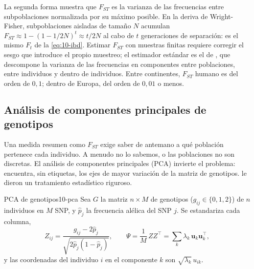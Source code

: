 La segunda forma muestra que $F_{ST}$ es la varianza de las frecuencias entre subpoblaciones normalizada por su máximo posible. En la deriva de Wright-Fisher, subpoblaciones aisladas de tamaño $N$ acumulan $F_{ST}\approx 1-(1-1/2N)^t\approx t/2N$ al cabo de $t$ generaciones de separación: es el mismo $F_t$ de la \cref{eq:10-ibd}. Estimar $F_{ST}$ con muestras finitas requiere corregir el sesgo que introduce el propio muestreo; el estimador estándar es el de \textcite{c10-weir1984}, que descompone la varianza de las frecuencias en componentes entre poblaciones, entre individuos y dentro de individuos. Entre continentes, $F_{ST}$ humano es del orden de $0{,}1$; dentro de Europa, del orden de $0{,}01$ o menos.

\subsection{Análisis de componentes principales de genotipos}

Una medida resumen como $F_{ST}$ exige saber de antemano a qué población pertenece cada individuo. A menudo no lo sabemos, o las poblaciones no son discretas. El análisis de componentes principales (PCA) invierte el problema: encuentra, sin etiquetas, los ejes de mayor variación de la matriz de genotipos. \textcite{c10-patterson2006} le dieron un tratamiento estadístico riguroso.

\begin{definicion}{PCA de genotipos}{10-pca}
Sea $G$ la matriz $n\times M$ de genotipos ($g_{ij}\in\{0,1,2\}$) de $n$ individuos en $M$ SNP, y $\hat p_j$ la frecuencia alélica del SNP $j$. Se estandariza cada columna,
\begin{equation}\label{eq:10-zpca}
Z_{ij} = \frac{g_{ij}-2\hat p_j}{\sqrt{2\hat p_j(1-\hat p_j)}},
\qquad
\Psi = \frac{1}{M}\,ZZ^{\top} = \sum_{k} \lambda_k\, \mathbf{u}_k\mathbf{u}_k^{\top},
\end{equation}
y las coordenadas del individuo $i$ en el componente $k$ son $\sqrt{\lambda_k}\,u_{ik}$.
\end{definicion}

\begin{simbolos}
\end{simbolos}

